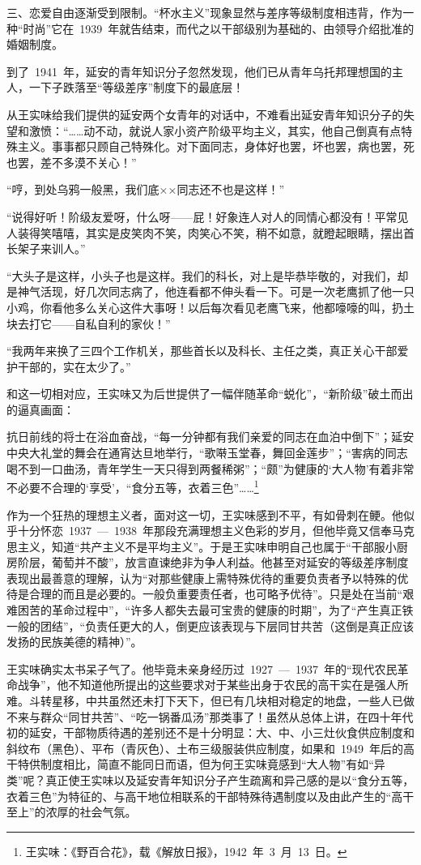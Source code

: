 三、恋爱自由逐渐受到限制。“杯水主义”现象显然与差序等级制度相违背，作为一种“时尚”它在~1939~年就告结束，而代之以干部级别为基础的、由领导介绍批准的婚姻制度。

到了~1941~年，延安的青年知识分子忽然发现，他们已从青年乌托邦理想国的主人，一下子跌落至“等级差序”制度下的最底层！

从王实味给我们提供的延安两个女青年的对话中，不难看出延安青年知识分子的失望和激愤：“……动不动，就说人家小资产阶级平均主义，其实，他自己倒真有点特殊主义。事事都只顾自己特殊化。对下面同志，身体好也罢，坏也罢，病也罢，死也罢，差不多漠不关心！”

“哼，到处乌鸦一般黑，我们底××同志还不也是这样！”

“说得好听！阶级友爱呀，什么呀——屁！好象连人对人的同情心都没有！平常见人装得笑嘻嘻，其实是皮笑肉不笑，肉笑心不笑，稍不如意，就瞪起眼睛，摆出首长架子来训人。”

“大头子是这样，小头子也是这样。我们的科长，对上是毕恭毕敬的，对我们，却是神气活现，好几次同志病了，他连看都不伸头看一下。可是一次老鹰抓了他一只小鸡，你看他多么关心这件大事呀！以后每次看见老鹰飞来，他都嚎嚎的叫，扔土块去打它——自私自利的家伙！”

“我两年来换了三四个工作机关，那些首长以及科长、主任之类，真正关心干部爱护干部的，实在太少了。”

和这一切相对应，王实味又为后世提供了一幅伴随革命“蜕化”，“新阶级”破土而出的逼真画面：

抗日前线的将士在浴血奋战，“每一分钟都有我们亲爱的同志在血泊中倒下”；延安中央大礼堂的舞会在通宵达旦地举行，“歌啭玉堂春，舞回金莲步”；“害病的同志喝不到一口曲汤，青年学生一天只得到两餐稀粥”；“颇”为健康的‘大人物’有着非常不必要不合理的‘享受’，“食分五等，衣着三色”……\footnote{王实味：《野百合花》，载《解放日报》，1942~年~3~月~13~日。}

作为一个狂热的理想主义者，面对这一切，王实味感到不平，有如骨刺在鲠。他似乎十分怀恋~1937~—~1938~年那段充满理想主义色彩的岁月，但他毕竟又信奉马克思主义，知道“共产主义不是平均主义”。于是王实味申明自己也属于“干部服小厨房阶层，葡萄并不酸”，放言直谏绝非为争人利益。他甚至对延安的等级差序制度表现出最善意的理解，认为“对那些健康上需特殊优待的重要负责者予以特殊的优待是合理的而且是必要的。一般负重要责任者，也可略予优待”。只是处在当前“艰难困苦的革命过程中”，“许多人都失去最可宝贵的健康的时期”，为了“产生真正铁一般的团结”，“负责任更大的人，倒更应该表现与下层同甘共苦（这倒是真正应该发扬的民族美德的精神）”。

王实味确实太书呆子气了。他毕竟未亲身经历过~1927~—~1937~年的“现代农民革命战争”，他不知道他所提出的这些要求对于某些出身于农民的高干实在是强人所难。斗转星移，中共虽然还未打下天下，但已有几块相对稳定的地盘，一些人已做不来与群众“同甘共苦”、“吃一锅番瓜汤”那类事了！虽然从总体上讲，在四十年代初的延安，干部物质待遇的差别还不是十分明显：大、中、小三灶伙食供应制度和斜纹布（黑色）、平布（青灰色）、土布三级服装供应制度，如果和~1949~年后的高干特供制度相比，简直不能同日而语，但为何王实味竟感到“大人物”有如“异类”呢？真正使王实味以及延安青年知识分子产生疏离和异己感的是以“食分五等，衣着三色”为特征的、与高干地位相联系的干部特殊待遇制度以及由此产生的“高干至上”的浓厚的社会气氛。

